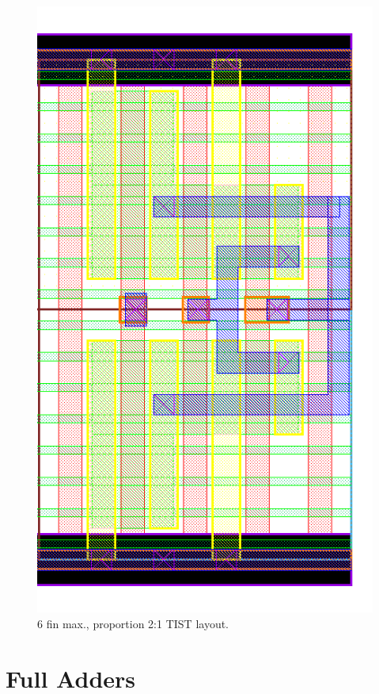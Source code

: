 \documentclass[pgmicro,mestrado,english]{iiufrgs}
\begin{document}
\begin{figure}[H]
\centering
\includegraphics[width=\textwidth,height=\textheight,keepaspectratio]{TIST6F3F.png}
\caption{6 fin max., proportion 2:1 TIST layout.}
\label{fig:TIST5F}
\end{figure}





\chapter{Full Adders}
\end{document}
